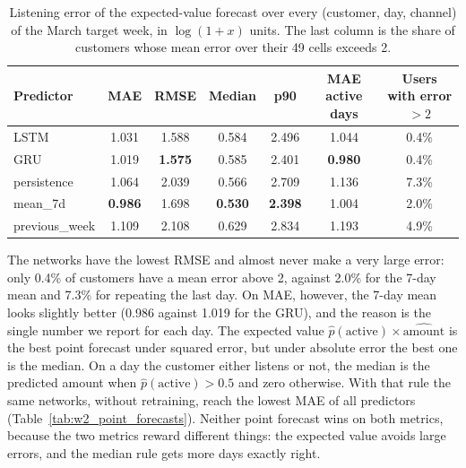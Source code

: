 \documentclass{article}
\begin{document}
\begin{table}[H]
\centering
\renewcommand{\arraystretch}{1.25}
\small
\begin{tabular}{|l|c|c|c|c|c|c|}
\hline
\textbf{Predictor} & \textbf{MAE} & \textbf{RMSE} & \textbf{Median} & \textbf{p90} & \textbf{MAE active days} & \textbf{Users with error $>2$} \\ \hline
LSTM          & 1.031 & 1.588 & 0.584 & 2.496 & 1.044 & 0.4\% \\ \hline
GRU           & 1.019 & \textbf{1.575} & 0.585 & 2.401 & \textbf{0.980} & 0.4\% \\ \hline
persistence   & 1.064 & 2.039 & 0.566 & 2.709 & 1.136 & 7.3\% \\ \hline
mean\_7d      & \textbf{0.986} & 1.698 & \textbf{0.530} & \textbf{2.398} & 1.004 & 2.0\% \\ \hline
previous\_week & 1.109 & 2.108 & 0.629 & 2.834 & 1.193 & 4.9\% \\ \hline
\end{tabular}
\caption{Listening error of the expected-value forecast over every (customer, day, channel) of the March target week, in $\log(1+x)$ units. The last column is the share of customers whose mean error over their 49 cells exceeds 2.}
\label{tab:w2_traj_listen}
\end{table}

The networks have the lowest RMSE and almost never make a very large error: only 0.4\% of customers have a mean error above 2, against 2.0\% for the 7-day mean and 7.3\% for repeating the last day. On MAE, however, the 7-day mean looks slightly better (0.986 against 1.019 for the GRU), and the reason is the single number we report for each day. The expected value $\hat p(\text{active}) \times \widehat{\text{amount}}$ is the best point forecast under squared error, but under absolute error the best one is the median. On a day the customer either listens or not, the median is the predicted amount when $\hat p(\text{active}) > 0.5$ and zero otherwise. With that rule the same networks, without retraining, reach the lowest MAE of all predictors (Table~\ref{tab:w2_point_forecasts}). Neither point forecast wins on both metrics, because the two metrics reward different things: the expected value avoids large errors, and the median rule gets more days exactly right.
\end{document}
